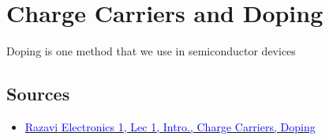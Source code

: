 \section{Charge Carriers and Doping}

Doping is one method that we use in semiconductor devices

\subsection{Sources}
\begin{itemize}
    \item \href{https://www.youtube.com/watch?v=yQDfVJzEymI}{\textcolor{blue}{Razavi Electronics 1, Lec 1, Intro., Charge Carriers, Doping}}
\end{itemize}

